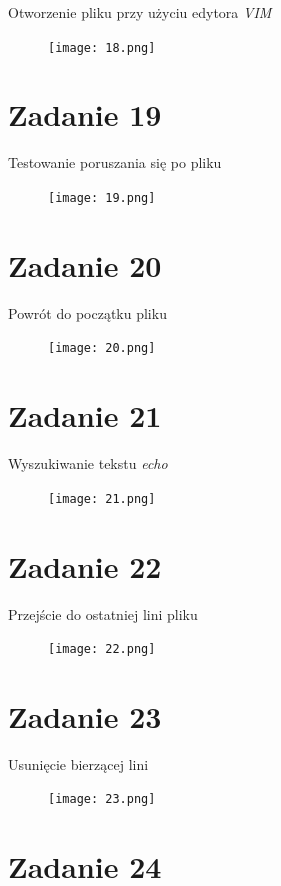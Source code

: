 \documentclass[fleqn,onecolumn,a4paper,12pt,titlepage]{article}
\begin{document}
Otworzenie pliku przy użyciu edytora \textit{VIM}
\begin{figure}[H]%
    \centering\texttt{[image: 18.png]}
\end{figure}

\section*{Zadanie 19}

Testowanie poruszania się po pliku
\begin{figure}[H]%
    \centering\texttt{[image: 19.png]}
\end{figure}

\section*{Zadanie 20}

Powrót do początku pliku
\begin{figure}[H]%
    \centering\texttt{[image: 20.png]}
\end{figure}

\section*{Zadanie 21}

Wyszukiwanie tekstu \textit{echo}
\begin{figure}[H]%
    \centering\texttt{[image: 21.png]}
\end{figure}

\section*{Zadanie 22}

Przejście do ostatniej lini pliku
\begin{figure}[H]%
    \centering\texttt{[image: 22.png]}
\end{figure}

\section*{Zadanie 23}

Usunięcie bierzącej lini
\begin{figure}[H]%
    \centering\texttt{[image: 23.png]}
\end{figure}

\section*{Zadanie 24}
\end{document}
